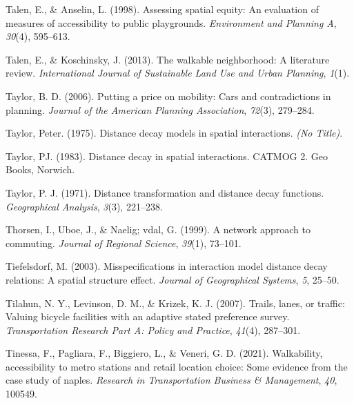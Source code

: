 \documentclass[
11pt, %
oneside, %
english, %
singlespacing, %
]{macthesis} %
\newlength{\cslhangindent}
\newenvironment{CSLReferences}[2] %
 {%
  \setlength{\parindent}{0pt}
  \ifodd #1 \everypar{\setlength{\hangindent}{\cslhangindent}}\ignorespaces\fi
  \ifnum #2 > 0
  \setlength{\parskip}{#2\baselineskip}
  \fi
 }%
 {}
\begin{document}
\begin{CSLReferences}{1}{0}
\leavevmode{}%
Talen, E., \& Anselin, L. (1998). Assessing spatial equity: An evaluation of measures of accessibility to public playgrounds. \emph{Environment and Planning A}, \emph{30}(4), 595--613.

\leavevmode{}%
Talen, E., \& Koschinsky, J. (2013). The walkable neighborhood: A literature review. \emph{International Journal of Sustainable Land Use and Urban Planning}, \emph{1}(1).

\leavevmode{}%
Taylor, B. D. (2006). Putting a price on mobility: Cars and contradictions in planning. \emph{Journal of the American Planning Association}, \emph{72}(3), 279--284.

\leavevmode{}%
Taylor, Peter. (1975). Distance decay models in spatial interactions. \emph{(No Title)}.

\leavevmode{}%
Taylor, PJ. (1983). Distance decay in spatial interactions. CATMOG 2. Geo Books, Norwich.

\leavevmode{}%
Taylor, P. J. (1971). Distance transformation and distance decay functions. \emph{Geographical Analysis}, \emph{3}(3), 221--238.

\leavevmode{}%
Thorsen, I., Uboe, J., \& Naelig; vdal, G. (1999). A network approach to commuting. \emph{Journal of Regional Science}, \emph{39}(1), 73--101.

\leavevmode{}%
Tiefelsdorf, M. (2003). Misspecifications in interaction model distance decay relations: A spatial structure effect. \emph{Journal of Geographical Systems}, \emph{5}, 25--50.

\leavevmode{}%
Tilahun, N. Y., Levinson, D. M., \& Krizek, K. J. (2007). Trails, lanes, or traffic: Valuing bicycle facilities with an adaptive stated preference survey. \emph{Transportation Research Part A: Policy and Practice}, \emph{41}(4), 287--301.

\leavevmode{}%
Tinessa, F., Pagliara, F., Biggiero, L., \& Veneri, G. D. (2021). Walkability, accessibility to metro stations and retail location choice: Some evidence from the case study of naples. \emph{Research in Transportation Business \& Management}, \emph{40}, 100549.


\end{CSLReferences}
\end{document}
